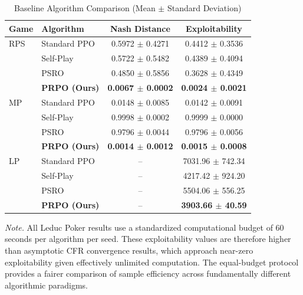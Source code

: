 \documentclass[sigconf,anonymous]{aamas}
\begin{document}
\begin{table}[h!]
\centering
\small
\caption{Baseline Algorithm Comparison (Mean $\pm$ Standard Deviation)}
\label{tab:baselines}
\begin{tabular}{llcc}
\hline
\textbf{Game} & \textbf{Algorithm} & \textbf{Nash Distance} & \textbf{Exploitability} \\ \hline
\rule{0pt}{2.2ex}RPS & Standard PPO & 0.5972 $\pm$ 0.4271 & 0.4412 $\pm$ 0.3536 \\
 & Self-Play & 0.5722 $\pm$ 0.5482 & 0.4389 $\pm$ 0.4094 \\
 & PSRO & 0.4850 $\pm$ 0.5856 & 0.3628 $\pm$ 0.4349 \\
 & \textbf{PRPO (Ours)} & \textbf{0.0067 $\pm$ 0.0002} & \textbf{0.0024 $\pm$ 0.0021} \\ \hline
\rule{0pt}{2.2ex}MP & Standard PPO & 0.0148 $\pm$ 0.0085 & 0.0142 $\pm$ 0.0091 \\
 & Self-Play & 0.9998 $\pm$ 0.0002 & 0.9999 $\pm$ 0.0000 \\
 & PSRO & 0.9796 $\pm$ 0.0044 & 0.9796 $\pm$ 0.0056 \\
 & \textbf{PRPO (Ours)} & \textbf{0.0014 $\pm$ 0.0012} & \textbf{0.0015 $\pm$ 0.0008} \\ \hline
\rule{0pt}{2.2ex}LP & Standard PPO & -- & 7031.96 $\pm$ 742.34 \\
 & Self-Play & -- & 4217.42 $\pm$ 924.20 \\
 & PSRO & -- & 5504.06 $\pm$ 556.25 \\
 & \textbf{PRPO (Ours)} & -- & \textbf{3903.66 $\pm$ 40.59} \\ \hline
\end{tabular}
\end{table}

\noindent\footnotesize\textit{Note.} All Leduc Poker results use a standardized computational budget of 60 seconds per algorithm per seed. These exploitability values are therefore higher than asymptotic CFR convergence results, which approach near-zero exploitability given effectively unlimited computation. The equal-budget protocol provides a fairer comparison of sample efficiency across fundamentally different algorithmic paradigms.\normalsize
\end{document}
